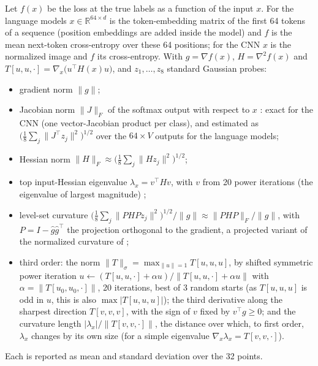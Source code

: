 \documentclass[10pt]{article}
\makeatletter
\renewcommand\paragraph{\@startsection{paragraph}{4}{\z@}{1.2ex \@plus .4ex \@minus .2ex}{-1em}{\normalfont\normalsize\bfseries}}
\makeatother
\begin{document}
\paragraph{Input derivatives.} Let $f(x)$ be the loss at the true labels as a function of the input $x$. For
the language models $x\in\mathbb R^{64\times d}$ is the token-embedding matrix of the first 64 tokens of a
sequence (position embeddings are added inside the model) and $f$ is the mean next-token cross-entropy over
these 64 positions; for the CNN $x$ is the normalized image and $f$ its cross-entropy. With $g=\nabla f(x)$,
$H=\nabla^2f(x)$ and $T[u,u,\cdot]=\nabla_x\big(u^\top H(x)u\big)$, and $z_1,\dots,z_8$ standard Gaussian
probes:
\begin{itemize}
\item gradient norm $\|g\|$;
\item Jacobian norm $\|J\|_F$ of the softmax output with respect to $x$ \citep{novak2018sensitivity}: exact
  for the CNN (one vector-Jacobian product per class), and estimated as
  $\big(\frac18\sum_j\|J^\top z_j\|^2\big)^{1/2}$ over the $64\times V$ outputs for the language models;
\item Hessian norm $\|H\|_F\approx\big(\frac18\sum_j\|Hz_j\|^2\big)^{1/2}$;
\item top input-Hessian eigenvalue $\lambda_x=v^\top Hv$, with $v$ from 20 power iterations (the eigenvalue
  of largest magnitude) \citep{moosavi2019cure};
\item level-set curvature $\big(\frac18\sum_j\|PHPz_j\|^2\big)^{1/2}/\|g\|\approx\|PHP\|_F/\|g\|$, with
  $P=I-\hat g\hat g^\top$ the projection orthogonal to the gradient, a projected variant of the normalized
  curvature of \citet{srinivas2022lowcurv};
\item third order: the norm $\|T\|_\sigma=\max_{\|u\|=1}T[u,u,u]$, by shifted symmetric power iteration
  $u\leftarrow(T[u,u,\cdot]+\alpha u)/\|T[u,u,\cdot]+\alpha u\|$ with $\alpha=\|T[u_0,u_0,\cdot]\|$, 20
  iterations, best of 3 random starts (as $T[u,u,u]$ is odd in $u$, this is also $\max|T[u,u,u]|$); the
  third derivative along the sharpest direction $T[v,v,v]$, with the sign of $v$ fixed by $v^\top g\ge0$; and
  the curvature length $|\lambda_x|/\|T[v,v,\cdot]\|$, the distance over which, to first order, $\lambda_x$
  changes by its own size (for a simple eigenvalue $\nabla_x\lambda_x=T[v,v,\cdot]$).
\end{itemize}
Each is reported as mean and standard deviation over the 32 points.
\end{document}
